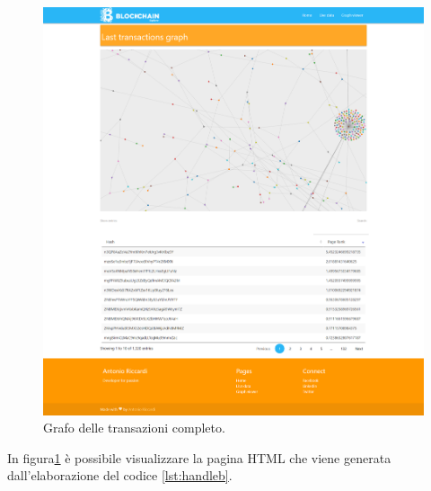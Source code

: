 \begin{itemize}

\begin{figure}[H]
	\centering
	\includegraphics[width=\textwidth,  height=0.60\textheight]{images/graphView.png}
	\caption{Grafo delle transazioni completo.}
	\label{fig:graphView}
\end{figure}
In figura\ref{fig:graphView} è possibile visualizzare la pagina HTML che viene generata dall'elaborazione del codice \ref{lst:handleb}. 

\end{itemize}